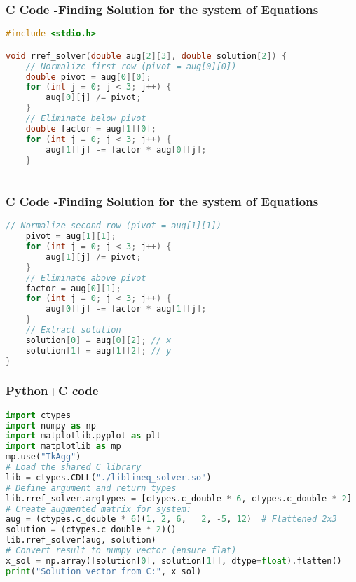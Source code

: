 \documentclass{beamer}
\begin{document}
\begin{frame}[fragile]
    \frametitle{C Code -Finding Solution for the system of Equations}

    \begin{lstlisting}[language=C]
#include <stdio.h>

void rref_solver(double aug[2][3], double solution[2]) {
    // Normalize first row (pivot = aug[0][0])
    double pivot = aug[0][0];
    for (int j = 0; j < 3; j++) {
        aug[0][j] /= pivot;
    }
    // Eliminate below pivot
    double factor = aug[1][0];
    for (int j = 0; j < 3; j++) {
        aug[1][j] -= factor * aug[0][j];
    }



    \end{lstlisting}
\end{frame}

\begin{frame}[fragile]
    \frametitle{C Code -Finding Solution for the system of Equations}

    \begin{lstlisting}[language=C]
    // Normalize second row (pivot = aug[1][1])
    pivot = aug[1][1];
    for (int j = 0; j < 3; j++) {
        aug[1][j] /= pivot;
    }
    // Eliminate above pivot
    factor = aug[0][1];
    for (int j = 0; j < 3; j++) {
        aug[0][j] -= factor * aug[1][j];
    }
    // Extract solution
    solution[0] = aug[0][2]; // x
    solution[1] = aug[1][2]; // y
}


    \end{lstlisting}
\end{frame}

\begin{frame}[fragile]
    \frametitle{Python+C code}

    \begin{lstlisting}[language=Python]
import ctypes
import numpy as np
import matplotlib.pyplot as plt
import matplotlib as mp
mp.use("TkAgg")
# Load the shared C library
lib = ctypes.CDLL("./liblineq_solver.so")
# Define argument and return types
lib.rref_solver.argtypes = [ctypes.c_double * 6, ctypes.c_double * 2]
# Create augmented matrix for system:
aug = (ctypes.c_double * 6)(1, 2, 6,   2, -5, 12)  # Flattened 2x3
solution = (ctypes.c_double * 2)()
lib.rref_solver(aug, solution)
# Convert result to numpy vector (ensure flat)
x_sol = np.array([solution[0], solution[1]], dtype=float).flatten()
print("Solution vector from C:", x_sol)


    \end{lstlisting}
\end{frame}
\end{document}
